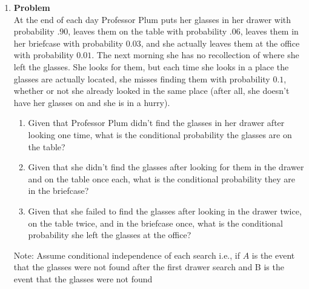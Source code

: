 \documentclass[12pt]{article}
\newenvironment{Ex}{\textbf{Problem}\vspace{.75em}\\}{}
\begin{document}
\begin{enumerate}
\begin{Ex}
\begin{solution}
\begin{enumerate}
        information ($P(X|D)$) is incorrectly focused on when a more
        correct assessment should look at both the specific
        information and the general information ($\alpha = 0.1$).
      \item The probability that a person has the disease given that
        both tests are positive should increase because the percent of
        the population who actually have the disease has increased.
      \item Yes. The results of one test do not influence the results
        of the other, and vice versa. No new information about the
        results of the seconcd test can be derived from the results of
        the first.
      \end{enumerate}
    \end{solution}
  \end{Ex}
\item
  \begin{Ex}
    At the end of each day Professor Plum puts her glasses in her
    drawer with probability $.90$, leaves them on the table with
    probability $.06$, leaves them in her briefcase with probability
    $0.03$, and she actually leaves them at the office with
    probability $0.01$. The next morning she has no recollection of
    where she left the glasses. She looks for them, but each time she
    looks in a place the glasses are actually located, she misses
    finding them with probability $0.1$, whether or not she already
    looked in the same place (after all, she doesn't have her glasses
    on and she is in a hurry).
    \begin{enumerate}
    \item Given that Professor Plum didn't find the glasses in her
      drawer after looking one time, what is the conditional
      probability the glasses are on the table?
    \item Given that she didn't find the glasses after looking for them
      in the drawer and on the table once each, what is the
      conditional probability they are in the briefcase?
    \item Given that she failed to find the glasses after looking in
      the drawer twice, on the table twice, and in the briefcase once,
      what is the conditional probability she left the glasses at the
      office?
    \end{enumerate}
    Note: Assume conditional independence of each search i.e., if $A$
    is the event that the glasses were not found after the first
    drawer search and B is the event that the glasses were not found

\end{Ex}
\end{enumerate}
\end{document}
